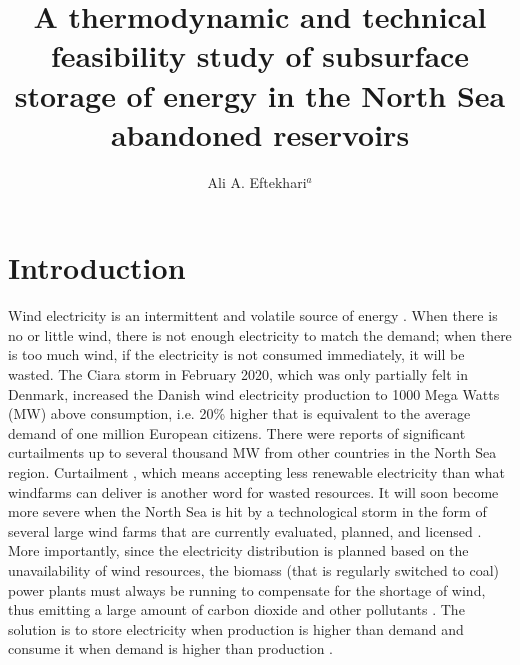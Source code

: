 \documentclass{ECOS_2021}
\title{\sffamily A thermodynamic and technical feasibility study of subsurface storage of energy in the North Sea abandoned reservoirs}
\author{Ali A. Eftekhari$^{a}$}
\begin{document}

\sffamily \Large \section{Introduction} \label{chap:Problem-definition} 
\rmfamily \normalsize

Wind electricity is an intermittent and volatile source of energy
\cite{gibescuEstimationVariabilityPredictability2009,ummelsImpactsWindPower2007}.
When there is no or little wind, there is not enough electricity to
match the demand; when there is too much wind, if the electricity
is not consumed immediately, it will be wasted. The Ciara storm in
February 2020, which was only partially felt in Denmark, increased
the Danish wind electricity production to 1000 Mega Watts (MW) above
consumption, i.e. 20\% higher that is equivalent to the average demand
of one million European citizens. There were reports of significant
curtailments up to several thousand MW from other countries in the
North Sea region. Curtailment \cite{lewWindSolarCurtailment2013},
which means accepting less renewable electricity than what windfarms
can deliver is another word for wasted resources. It will soon become
more severe when the North Sea is hit by a technological storm in
the form of several large wind farms that are currently evaluated,
planned, and licensed \cite{GlobalOffshoreRenewable}. More importantly,
since the electricity distribution is planned based on the unavailability
of wind resources, the biomass (that is regularly switched to coal)
power plants must always be running to compensate for the shortage
of wind, thus emitting a large amount of carbon dioxide and other
pollutants \cite{meibomEnergyComesTogether2013}. The solution is
to store electricity when production is higher than demand and consume
it when demand is higher than production \cite{pedersenEnergyStorageTechnologies2019}. 
\end{document}
